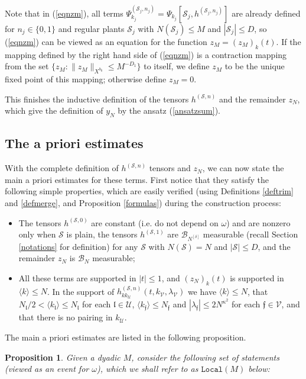 \documentclass[11 pt,reqno]{amsart}
\newtheorem{prop}[thm]{Proposition}
\theoremstyle{definition}
\theoremstyle{remark}
\numberwithin{equation}{section}
\newcommand{\Sc}{\mathcal{S}}
\newcommand{\Uc}{\mathcal{U}}
\newcommand{\Bc}{\mathcal{B}}
\newcommand{\Vc}{\mathcal{V}}
\newcommand{\ff}{\mathfrak{f}}
\newcommand{\lf}{\mathfrak{l}}
\begin{document}
{Note that in (\ref{eqnzm}), all terms $\Psi_{k_j}^{(\Sc_j,n_j)}=\Psi_{k_j}[\Sc_j,h^{(\Sc_j,n_j)}]$ are already defined for $n_j\in\{0,1\}$ and regular plants $\Sc_j$ with $N(\Sc_j)\leq M$ and $|\Sc_j|\leq D$, so (\ref{eqnzm}) can be viewed as an equation for the function $z_M=(z_M)_k(t)$. If the mapping defined by the right hand side of (\ref{eqnzm}) is a contraction mapping from the set $\{z_M:\|z_M\|_{X^{b_0}}\leq M^{-D_1}\}$ to itself, we define $z_M$ to be the unique fixed point of this mapping; otherwise define $z_M=0$.

This finishes the inductive definition of the tensors $h^{(\Sc,n)}$ and the remainder $z_N$, which give the definition of $y_N$ by the ansatz (\ref{ansatzsum}).
 \subsection{The a priori estimates}\label{section5.3} With the complete definition of $h^{(\Sc,n)}$ tensors and $z_N$, we can now state the main a priori estimates for these terms. First notice that they satisfy the following simple properties, which are easily verified (using Definitions \ref{deftrim} and \ref{defmerge}, and Proposition \ref{formulas}) during the construction process:
 \begin{itemize}
 \item The tensors $h^{(\Sc,0)}$ are constant (i.e. do not depend on $\omega$) and are nonzero only when $\Sc$ is plain, the tensors $h^{(\Sc,1)}$ are $\Bc_{N^{[\delta]}}$ measurable (recall Section \ref{notations} for definition) for any $\Sc$ with $N(\Sc)=N$ and $|\Sc|\leq D$, and the remainder $z_N$ is $\Bc_N$ measurable;
 \item All these terms are supported in  $|t|\leq 1$, and $(z_N)_k(t)$ is supported in $\langle k\rangle\leq N$. In the support of $h_{kk_\Uc}^{(\Sc,n)}(t,k_{\Vc},\lambda_\Vc)$ we have $\langle k\rangle\leq N$, that $N_\lf/2<\langle k_\lf\rangle\leq N_\lf$ for each $\lf\in\Uc$, $\langle k_\ff\rangle\leq N_\ff$ and $|\lambda_\ff|\leq 2N^{\kappa^2} $ for each $\ff\in\Vc$, and that there is no pairing in $k_{\Uc}$.
 \end{itemize} The main a priori estimates are listed in the following proposition.
 \begin{prop}\label{mainprop} Given a dyadic $M$, consider the following set of statements (viewed as an event for $\omega$), which we shall refer to as $\mathtt{Local}(M)$ below: 


\end{prop}}
\end{document}
